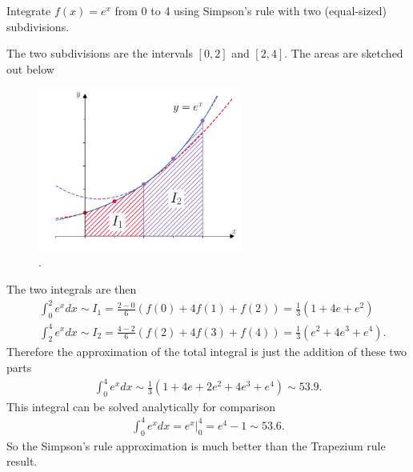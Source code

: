 \exemple{\upline}
{
Integrate $f(x)=e^x$ from 0 to 4 using Simpson's rule with two (equal-sized) subdivisions.

\noindent The two subdivisions are the intervals $[0,2]$ and $[2,4]$. The areas are sketched out below
\begin{figure}[H]
	\begin{center}
	\includegraphics[width=0.6\textwidth]{figures/ch5_simpsons_example.pdf} 
	  \caption{.} \label{fig:ch5_simpsons_example}
	\end{center}
\end{figure}
\noindent The two integrals are then
\begin{align*}
&\int_0^2 e^x dx \sim I_1 = \frac{2-0}{6} \left(f(0) + 4f(1) + f(2) \right) = \frac{1}{3}\left(1 + 4e + e^2\right) \\
&\int_2^4 e^x dx \sim I_2 = \frac{4-2}{6} \left(f(2) + 4f(3) + f(4) \right) = \frac{1}{3}\left(e^2 + 4e^3 + e^4\right).
\end{align*}
Therefore the approximation of the total integral is just the addition of these two parts
\begin{align*}
\int_0^4 e^x dx \sim \frac{1}{3}\left(1 + 4e + 2e^2 + 4e^3 + e^4\right) \sim 53.9.
\end{align*}
This integral can be solved analytically for comparison
\begin{align*}
\int_0^4 e^x dx = \left. e^x\right|_0^4 = e^4 - 1 \sim 53.6.
\end{align*}
So the Simpson's rule approximation is much better than the Trapezium rule result.
}{\downline}


